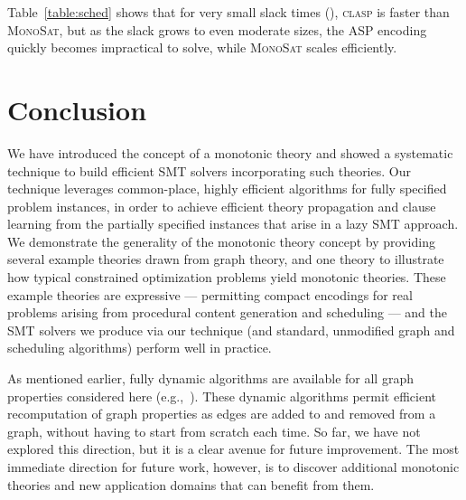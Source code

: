 \documentclass[runningheads]{llncs}
\newcommand{\comments}[1]{}
\newcommand{\algformat}[1]{\textsc{#1}\xspace}
\newcommand{\monosat}{\algformat{MonoSat}}
\newcommand{\clasp}{\algformat{clasp}}
\begin{document}
Table~\ref{table:sched} shows that for very small slack times (),
\clasp is faster than \monosat, but as the slack grows to even moderate sizes,
the ASP encoding quickly becomes impractical to solve, while \monosat scales efficiently. 

 

\comments{
, of
which the SAT solver must choose half to be scheduled within 50, 100,
or 1000 time slots, respectively. 
As can be seen in
Table \ref{table:sched}, our theory solver scales well as the problem
size increases.
}




\vspace*{-1ex}
\section{Conclusion}

We have introduced the concept of a monotonic theory
and showed a systematic technique to build efficient SMT solvers incorporating
such theories.  Our technique leverages common-place, highly efficient
algorithms for fully specified problem instances, in order to achieve
efficient theory propagation and clause learning from the partially specified
instances that arise in a lazy SMT approach.
We demonstrate the generality of the monotonic theory concept by providing
several example theories drawn from graph theory, and one theory to illustrate
how typical constrained optimization problems yield monotonic theories.
These example theories are expressive --- permitting compact encodings for
real problems arising from procedural content generation and scheduling ---
and the SMT solvers we produce via our technique (and standard,
unmodified graph and scheduling algorithms) perform well in practice.


As mentioned earlier, fully dynamic algorithms
are available for all graph properties considered here
(e.g.,~\cite{henzinger1995fully,thorup1999undirected,thorup2000near,holm2001poly,thorup2001fully}).
These dynamic algorithms permit efficient recomputation of graph
properties as edges are added to and removed from a graph, without
having to start from scratch each time. So far, we have not explored this
direction, but it is a clear avenue for future improvement.
The most immediate direction for future work, however, is
to discover additional
monotonic theories and new application domains that can benefit from them.





\newpage



\end{document}
